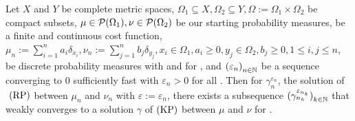 \begin{theorem}\label{RelatRegSolOrigSolPlan}
	Let $X$ and $Y$ be complete metric spaces, $\Omega_1 \subseteq X, \Omega_2 \subseteq Y, \Omega := \Omega_1 \times \Omega_2$ be compact subsets, $\mu \in \PM{\Omega_1}, \nu \in \PM{\Omega_2}$ be our starting probability measures, \map[c]{\Omega}{\RZero} be a finite and continuous cost function, $\mu_n := \sum_{i = 1}^n a_i \delta_{x_i}, \nu_n := \sum_{j = 1}^n b_j \delta_{y_j}, x_i \in \Omega_1, a_i \ge 0, y_j \in \Omega_2, b_j \ge 0, 1 \le i, j \le n$, be discrete probability measures with  and  for \Ninf, and ${(\varepsilon_n)}_{\NinN}$ be a sequence converging to $0$ sufficiently fast with $\varepsilon_n > 0$ for all \NinN. Then for $\gamma_n^{\varepsilon_n}$, the solution of$\text{\normalfont\ (RP)}$ between $\mu_n$ and $\nu_n$ with $\varepsilon := \varepsilon_n$, there exists a subsequence ${(\gamma_{n_k}^{\varepsilon_{n_k}})}_{\NinN[k]}$ that weakly converges to a solution $\gamma$ of$\text{\normalfont\ (KP)}$ between $\mu$ and $\nu$ for \Ninf.
\end{theorem}

